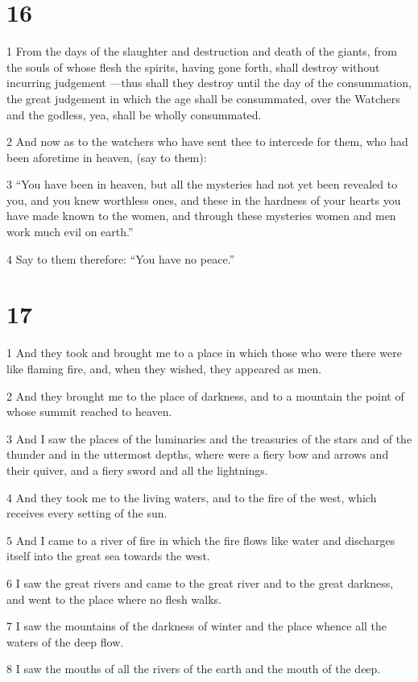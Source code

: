 \chapter{16}

\par 1 From the days of the slaughter and destruction and death of the giants, from the souls of whose flesh the spirits, having gone forth, shall destroy without incurring judgement —thus shall they destroy until the day of the consummation, the great judgement in which the age shall be consummated, over the Watchers and the godless, yea, shall be wholly consummated.
\par 2 And now as to the watchers who have sent thee to intercede for them, who had been aforetime in heaven, (say to them):
\par 3 “You have been in heaven, but all the mysteries had not yet been revealed to you, and you knew worthless ones, and these in the hardness of your hearts you have made known to the women, and through these mysteries women and men work much evil on earth.”
\par 4 Say to them therefore: “You have no peace.”

\chapter{17}

\par 1 And they took and brought me to a place in which those who were there were like flaming fire, and, when they wished, they appeared as men.
\par 2 And they brought me to the place of darkness, and to a mountain the point of whose summit reached to heaven. 
\par 3 And I saw the places of the luminaries and the treasuries of the stars and of the thunder and in the uttermost depths, where were a fiery bow and arrows and their quiver, and a fiery sword and all the lightnings.
\par 4 And they took me to the living waters, and to the fire of the west, which receives every setting of the sun.
\par 5 And I came to a river of fire in which the fire flows like water and discharges itself into the great sea towards the west.
\par 6 I saw the great rivers and came to the great river and to the great darkness, and went to the place where no flesh walks.
\par 7 I saw the mountains of the darkness of winter and the place whence all the waters of the deep flow.
\par 8 I saw the mouths of all the rivers of the earth and the mouth of the deep.

